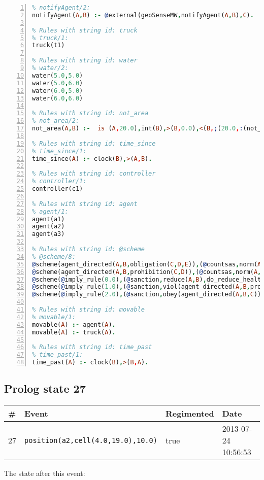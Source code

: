 \documentclass[11pt]{article}\usepackage[utf8]{inputenc}\usepackage{geometry}
\begin{document}
\begin{lstlisting}[language=Prolog, numbers=left]
% Rules with string id: notifyAgent
% notifyAgent/2:
notifyAgent(A,B) :- @external(geoSenseMW,notifyAgent(A,B),C).

% Rules with string id: truck
% truck/1:
truck(t1)

% Rules with string id: water
% water/2:
water(5.0,5.0)
water(5.0,6.0)
water(6.0,5.0)
water(6.0,6.0)

% Rules with string id: not_area
% not_area/2:
not_area(A,B) :-  is (A,20.0),int(B),>(B,0.0),<(B,;(20.0,:(not_area(A,B), is (-(B),20.0)))),int(A),>(A,0.0),<(A,;(20.0,:(area(A,B),-(int(A))))),int(B),>(A,0.0),>(B,0.0),<(A,21.0),<(B,21.0).

% Rules with string id: time_since
% time_since/1:
time_since(A) :- clock(B),>(A,B).

% Rules with string id: controller
% controller/1:
controller(c1)

% Rules with string id: agent
% agent/1:
agent(a1)
agent(a2)
agent(a3)

% Rules with string id: @scheme
% @scheme/8:
@scheme(agent_directed(A,B,obligation(C,D,E)),(@countsas,norm(A,B,F,obligation(C,D,E)),F),false,(listTrue(C)),(time_past(D)),false,[plus(viol(agent_directed(A,B,obligation(C,D,E))))|[]],[plus(obey(agent_directed(A,B,obligation(C,D,E))))|[]])
@scheme(agent_directed(A,B,prohibition(C,D)),(@countsas,norm(A,B,E,prohibition(C,D)),E),(listTrue(C)),false,(false),false,[plus(viol(agent_directed(A,B,prohibition(C,D))))|[]],[plus(obey(agent_directed(A,B,prohibition(C,D))))|[]])
@scheme(@imply_rule(0.0),(@sanction,reduce(A,B),do_reduce_health(A,B),notifyAgent(A,changed(status))),true,false,false,false,[min(reduce(A,B))|[]],[])
@scheme(@imply_rule(1.0),(@sanction,viol(agent_directed(A,B,prohibition(C,D))),do_sanction(D)),true,false,false,false,[min(viol(agent_directed(A,B,prohibition(C,D))))|[]],[])
@scheme(@imply_rule(2.0),(@sanction,obey(agent_directed(A,B,C))),true,false,false,false,[min(obey(agent_directed(A,B,C)))|[]],[])

% Rules with string id: movable
% movable/1:
movable(A) :- agent(A).
movable(A) :- truck(A).

% Rules with string id: time_past
% time_past/1:
time_past(A) :- clock(B),>(B,A).

\end{lstlisting}
\clearpage 
\subsection{Prolog state 27}
\begin{table}[ht]
\centering 
\begin{tabular}{l l l l} 
\textbf{\#} & \textbf{Event} & \textbf{Regimented} & \textbf{Date} \\ [0.5ex] 
\hline
27&\texttt{position(a2,cell(4.0,19.0),10.0)}&true&2013-07-24 10:56:53\\ [1ex] \hline\end{tabular}
\end{table}
The state after this event:
\end{document}
